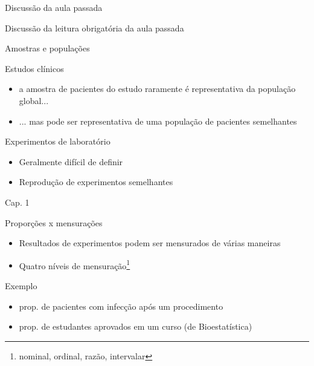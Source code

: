 \documentclass{beamer}
\begin{document}

\begin{frame}{Discussão da aula passada}
  \begin{block}{}
    Discussão da leitura obrigatória da aula passada
  \end{block}
\end{frame}

\begin{frame}{Amostras e populações}
  \begin{block}{Estudos clínicos}
    \begin{itemize}
      \footnotesize
    \item a amostra de pacientes do estudo raramente é representativa da população global...
    \item ... mas pode ser representativa de uma população de pacientes semelhantes
    \end{itemize}
  \end{block}
  \begin{block}{Experimentos de laboratório}
    \begin{itemize}
      \footnotesize
    \item Geralmente difícil de definir
    \item Reprodução de experimentos semelhantes
    \end{itemize}
  \end{block}

  \vfill
  \hfill \scriptsize Cap. 1
\end{frame}

\begin{frame}{Proporções x mensurações}
  \begin{itemize}
    \footnotesize
  \item Resultados de experimentos podem ser mensurados de várias maneiras
  \item Quatro níveis de mensuração\footnote{nominal, ordinal, razão, intervalar}
  \end{itemize}
  \begin{exampleblock}{Exemplo}
    \begin{itemize}
      \footnotesize
    \item prop. de pacientes com infecção após um procedimento
    \item prop. de estudantes aprovados em um curso (de Bioestatística)
    \end{itemize}
  \end{exampleblock}
\end{frame}
\end{document}
